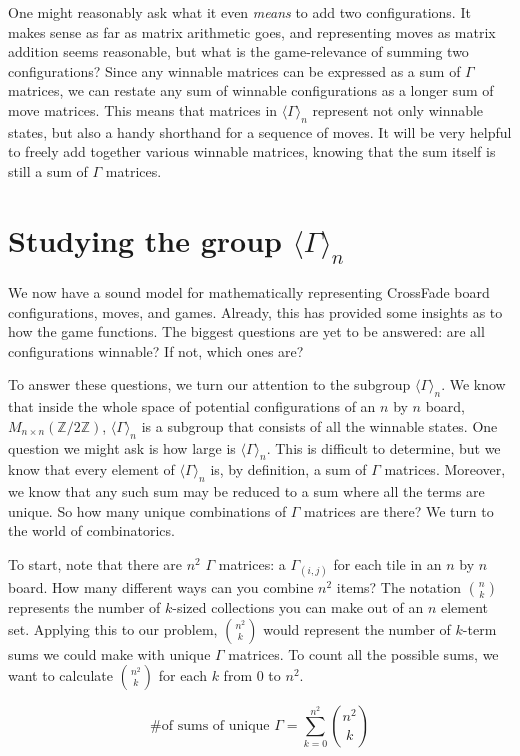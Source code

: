 \documentclass{article}[12pt]
\newcommand{\gen}[2]{\Gamma_{(#1,#2)}}
\newcommand{\group}[1]{M_{#1 \times #1}(\mathbb{Z}/2\mathbb{Z})}
\newcommand{\subgroup}[1]{\langle\Gamma\rangle_{#1}}
\begin{document}
One might reasonably ask what it even \emph{means} to add two configurations.  It makes sense as far as matrix arithmetic goes, and representing moves as matrix addition seems reasonable, but what is the game-relevance of summing two configurations?  Since any winnable matrices can be expressed as a sum of $\Gamma$ matrices, we can restate any sum of winnable configurations as a longer sum of move matrices.  This means that matrices in $\subgroup{n}$ represent not only winnable states, but also a handy shorthand for a sequence of moves.  It will be very helpful to freely add together various winnable matrices, knowing that the sum itself is still a sum of $\Gamma$ matrices.

\section{Studying the group $\subgroup{n}$}

We now have a sound model for mathematically representing CrossFade board configurations, moves, and games.  Already, this has provided some insights as to how the game functions.  The biggest questions are yet to be answered: are all configurations winnable?  If not, which ones are?

To answer these questions, we turn our attention to the subgroup $\subgroup{n}$.  We know that inside the whole space of potential configurations of an $n$ by $n$ board, $\group{n}$, $\subgroup{n}$ is a subgroup that consists of all the winnable states.  One question we might ask is how large is $\subgroup{n}$.  This is difficult to determine, but we know that every element of $\subgroup{n}$ is, by definition, a sum of $\Gamma$ matrices.  Moreover, we know that any such sum may be reduced to a sum where all the terms are unique.  So how many unique combinations of $\Gamma$ matrices are there?  We turn to the world of combinatorics.

To start, note that there are $n^2$ $\Gamma$ matrices: a $\gen{i}{j}$ for each tile in an $n$ by $n$ board.  How many different ways can you combine $n^2$ items?  The notation $n \choose k$ represents the number of $k$-sized collections you can make out of an $n$ element set.  Applying this to our problem, $n^2 \choose k$ would represent the number of $k$-term sums we could make with unique $\Gamma$ matrices.  To count all the possible sums, we want to calculate $n^2 \choose k$ for each $k$ from 0 to $n^2$.

\begin{equation}
\label{subgroup_size}
\text{\# of sums of unique $\Gamma$} = \sum_{k = 0}^{n^2} {n^2 \choose k}
\end{equation}
\end{document}
